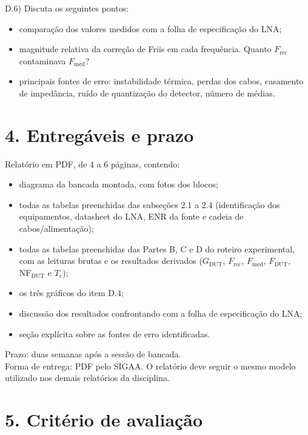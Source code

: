 \documentclass[11pt,a4paper]{article}
\begin{document}
D.6) Discuta os seguintes pontos:
\begin{itemize}[leftmargin=1.5em]
  \item comparação dos valores medidos com a folha de especificação do LNA;
  \item magnitude relativa da correção de Friis em cada frequência. Quanto $F_{\text{rec}}$ contaminava $F_{\text{med}}$?
  \item principais fontes de erro: instabilidade térmica, perdas dos cabos, casamento de impedância, ruído de quantização do detector, número de médias.
\end{itemize}

\section*{4. Entregáveis e prazo}

\begin{entrega}
Relatório em PDF, de 4 a 6 páginas, contendo:
\begin{itemize}[leftmargin=1.5em]
  \item diagrama da bancada montada, com fotos dos blocos;
  \item todas as tabelas preenchidas das subseções 2.1 a 2.4 (identificação dos equipamentos, datasheet do LNA, ENR da fonte e cadeia de cabos/alimentação);
  \item todas as tabelas preenchidas das Partes B, C e D do roteiro experimental, com as leituras brutas e os resultados derivados ($G_{\text{DUT}}$, $F_{\text{rec}}$, $F_{\text{med}}$, $F_{\text{DUT}}$, $\mathrm{NF}_{\text{DUT}}$ e $T_e$);
  \item os três gráficos do item D.4;
  \item discussão dos resultados confrontando com a folha de especificação do LNA;
  \item seção explícita sobre as fontes de erro identificadas.
\end{itemize}
\end{entrega}

Prazo: duas semanas após a sessão de bancada.\\
Forma de entrega: PDF pelo SIGAA. O relatório deve seguir o mesmo modelo utilizado nos demais relatórios da disciplina.

\section*{5. Critério de avaliação}
\end{document}
